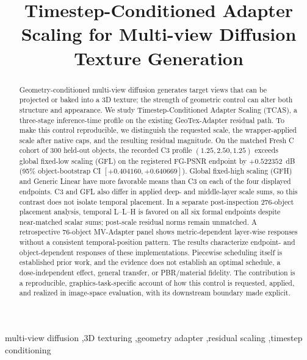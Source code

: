 \documentclass[times,twocolumn,final]{elsarticle}
\begin{document}
\begin{frontmatter}

\title{Timestep-Conditioned Adapter Scaling for Multi-view Diffusion Texture Generation}


\begin{abstract}
Geometry-conditioned multi-view diffusion generates target views that can be projected or baked into a 3D texture; the strength of geometric control can alter both structure and appearance. We study Timestep-Conditioned Adapter Scaling (TCAS), a three-stage inference-time profile on the existing GeoTex-Adapter residual path. To make this control reproducible, we distinguish the requested scale, the wrapper-applied scale after native caps, and the resulting residual magnitude. On the matched Fresh C cohort of 300 held-out objects, the recorded C3 profile $(1.25,2.50,1.25)$ exceeds global fixed-low scaling (GFL) on the registered FG-PSNR endpoint by $+0.522352$~dB (95\% object-bootstrap CI $[+0.404160,+0.640669]$). Global fixed-high scaling (GFH) and Generic Linear have more favorable means than C3 on each of the four displayed endpoints. C3 and GFL also differ in applied deep- and middle-layer scale sums, so this contrast does not isolate temporal placement. In a separate post-inspection 276-object placement analysis, temporal L--L--H is favored on all six formal endpoints despite near-matched scalar sums; post-scale residual norms remain unmatched. A retrospective 76-object MV-Adapter panel shows metric-dependent layer-wise responses without a consistent temporal-position pattern. The results characterize endpoint- and object-dependent responses of these implementations. Piecewise scheduling itself is established prior work, and the evidence does not establish an optimal schedule, a dose-independent effect, general transfer, or PBR/material fidelity. The contribution is a reproducible, graphics-task-specific account of how this control is requested, applied, and realized in image-space evaluation, with its downstream boundary made explicit.
\end{abstract}

\begin{keyword}
\KWD
multi-view diffusion \sep 3D texturing \sep geometry adapter \sep residual scaling \sep timestep conditioning
\end{keyword}

\end{frontmatter}
\end{document}
